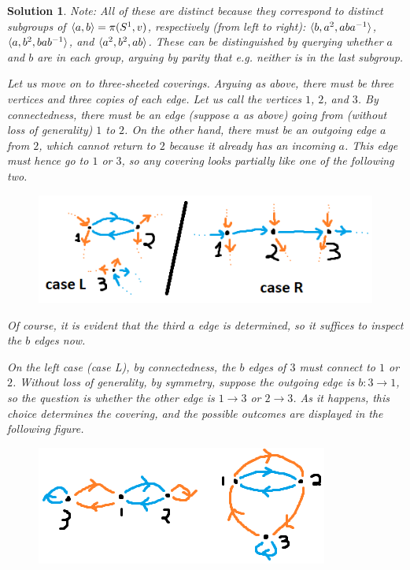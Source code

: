 \documentclass{article}
\theoremstyle{plain}
\theoremstyle{nonumberplain}
\newtheorem{sol}{Solution}
\DeclarePairedDelimiter{\braket}{\langle}{\rangle}
\begin{document}
\begin{sol}
Note: All of these are distinct because they correspond to distinct subgroups of $\braket{a,b} = \pi(S^1, v)$, respectively (from left to right): $\braket{b,a^2, aba^{-1}}$, $\braket{a,b^2,bab^{-1}}$, and $\braket{a^2, b^2, ab}$. These can be distinguished by querying whether $a$ and $b$ are in each group, arguing by parity that e.g. neither is in the last subgroup.

\medskip

Let us move on to three-sheeted coverings. Arguing as above, there must be three vertices and three copies of each edge. Let us call the vertices $1$, $2$, and $3$. By connectedness, there must be an edge (suppose $a$ as above) going from (without loss of generality) $1$ to $2$. On the other hand, there must be an outgoing edge $a$ from $2$, which cannot return to $2$ because it already has an incoming $a$. This edge must hence go to $1$ or $3$, so any covering looks partially like one of the following two.
\begin{figure}[H]
\centering
\includegraphics[width=\linewidth]{cov3}
\end{figure}

Of course, it is evident that the third $a$ edge is determined, so it suffices to inspect the $b$ edges now.

On the left case (case L), by connectedness, the $b$ edges of $3$ must connect to $1$ or $2$. Without loss of generality, by symmetry, suppose the outgoing edge is $b \colon 3 \to 1$, so the question is whether the other edge is $1 \to 3$ or $2 \to 3$. As it happens, this choice determines the covering, and the possible outcomes are displayed in the following figure.
\begin{figure}[H]
\centering
\includegraphics[width=\linewidth]{cov4}
\end{figure}


\end{sol}
\end{document}
